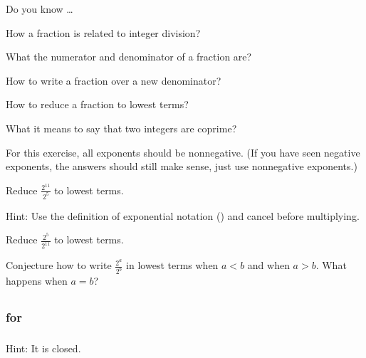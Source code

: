 \begin{exer}[\exerR] %
\label{exer_dyk_fractions}
    Do you know \ldots
        \begin{exerpart}
            \item How a fraction is related to integer division?
            \item What the numerator and denominator of a fraction are?
            \item How to write a fraction over a new denominator?
            \item How to reduce a fraction to lowest terms?
            \item What it means to say that two integers are coprime?
        \end{exerpart}
\end{exer}

\begin{exer} [\exerE] %
\label{exer_reduce_fractions_powers}
    For this exercise, all exponents should be nonnegative. (If you have seen negative exponents, the answers should still make sense, just use nonnegative exponents.)
    \begin{exerpart}
        \item Reduce $\displaystyle \frac{2^{11}}{2^5}$ to lowest terms.
        
        Hint: Use the definition of exponential notation () and cancel before multiplying.
        \item Reduce $\displaystyle \frac{2^5}{2^{11}}$ to lowest terms.
        \item Conjecture how to write $\displaystyle \frac{2^a}{2^b}$ in lowest terms when $a<b$ and when $a >b$.  What happens when $a=b$?
    \end{exerpart}
\end{exer}

\subsection{\answers}

\subsubsection{\answers for  \sublockers}

\subsubsection*{ \answers}
   Hint: It is closed.
   
